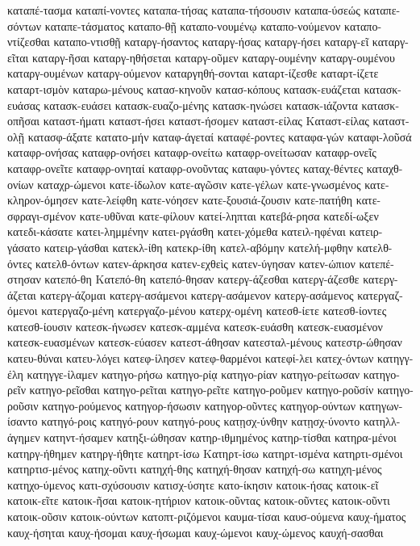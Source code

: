 {καταπέ-τασμα
καταπί-νοντες
καταπα-τήσας
καταπα-τήσουσιν
καταπα-ύσεώς
καταπε-σόντων
καταπε-τάσματος
καταπο-θῇ
καταπο-νουμένῳ
καταπο-νούμενον
καταπο-ντίζεσθαι
καταπο-ντισθῇ
καταργ-ήσαντος
καταργ-ήσας
καταργ-ήσει
καταργ-εῖ
καταργ-εῖται
καταργ-ῆσαι
καταργ-ηθήσεται
καταργ-οῦμεν
καταργ-ουμένην
καταργ-ουμένου
καταργ-ουμένων
καταργ-ούμενον
καταργηθή-σονται
καταρτ-ίζεσθε
καταρτ-ίζετε
καταρτ-ισμὸν
καταρω-μένους
κατασ-κηνοῦν
κατασ-κόπους
κατασκ-ευάζεται
κατασκ-ευάσας
κατασκ-ευάσει
κατασκ-ευαζο-μένης
κατασκ-ηνώσει
κατασκ-ιάζοντα
κατασκ-οπῆσαι
καταστ-ήματι
καταστ-ήσει
καταστ-ήσομεν
καταστ-είλας
Καταστ-είλας
καταστ-ολῇ
κατασφ-άξατε
κατατο-μήν
καταφ-άγεταί
καταφέ-ροντες
καταφα-γών
καταφι-λοῦσά
καταφρ-ονήσας
καταφρ-ονήσει
καταφρ-ονείτω
καταφρ-ονείτωσαν
καταφρ-ονεῖς
καταφρ-ονεῖτε
καταφρ-ονηταί
καταφρ-ονοῦντας
καταφυ-γόντες
καταχ-θέντες
καταχθ-ονίων
καταχρ-ώμενοι
κατε-ίδωλον
κατε-αγῶσιν
κατε-γέλων
κατε-γνωσμένος
κατε-κληρον-όμησεν
κατε-λείφθη
κατε-νόησεν
κατε-ξουσιά-ζουσιν
κατε-πατήθη
κατε-σφραγι-σμένον
κατε-υθῦναι
κατε-φίλουν
κατεί-ληπται
κατεβά-ρησα
κατεδί-ωξεν
κατεδι-κάσατε
κατει-λημμένην
κατει-ργάσθη
κατει-χόμεθα
κατειλ-ηφέναι
κατειρ-γάσατο
κατειρ-γάσθαι
κατεκλ-ίθη
κατεκρ-ίθη
κατελ-αβόμην
κατελή-μφθην
κατελθ-όντες
κατελθ-όντων
κατεν-άρκησα
κατεν-εχθεὶς
κατεν-ύγησαν
κατεν-ώπιον
κατεπέ-στησαν
κατεπό-θη
Κατεπό-θη
κατεπό-θησαν
κατεργ-άζεσθαι
κατεργ-άζεσθε
κατεργ-άζεται
κατεργ-άζομαι
κατεργ-ασάμενοι
κατεργ-ασάμενον
κατεργ-ασάμενος
κατεργαζ-όμενοι
κατεργαζο-μένη
κατεργαζο-μένου
κατερχ-ομένη
κατεσθ-ίετε
κατεσθ-ίοντες
κατεσθ-ίουσιν
κατεσκ-ήνωσεν
κατεσκ-αμμένα
κατεσκ-ευάσθη
κατεσκ-ευασμένον
κατεσκ-ευασμένων
κατεσκ-εύασεν
κατεστ-άθησαν
κατεσταλ-μένους
κατεστρ-ώθησαν
κατευ-θύναι
κατευ-λόγει
κατεφ-ίλησεν
κατεφ-θαρμένοι
κατεφί-λει
κατεχ-όντων
κατηγγ-έλη
κατηγγε-ίλαμεν
κατηγο-ρήσω
κατηγο-ρίᾳ
κατηγο-ρίαν
κατηγο-ρείτωσαν
κατηγο-ρεῖν
κατηγο-ρεῖσθαι
κατηγο-ρεῖται
κατηγο-ρεῖτε
κατηγο-ροῦμεν
κατηγο-ροῦσίν
κατηγο-ροῦσιν
κατηγο-ρούμενος
κατηγορ-ήσωσιν
κατηγορ-οῦντες
κατηγορ-ούντων
κατηγων-ίσαντο
κατηγό-ροις
κατηγό-ρουν
κατηγό-ρους
κατῃσχ-ύνθην
κατῃσχ-ύνοντο
κατηλλ-άγημεν
κατηντ-ήσαμεν
κατηξι-ώθησαν
κατηρ-ιθμημένος
κατηρ-τίσθαι
κατηρα-μένοι
κατηργ-ήθημεν
κατηργ-ήθητε
κατηρτ-ίσω
Κατηρτ-ίσω
κατηρτ-ισμένα
κατηρτι-σμένοι
κατηρτισ-μένος
κατηχ-οῦντι
κατηχή-θης
κατηχή-θησαν
κατηχή-σω
κατηχη-μένος
κατηχο-ύμενος
κατι-σχύσουσιν
κατισχ-ύσητε
κατο-ίκησιν
κατοικ-ήσας
κατοικ-εῖ
κατοικ-εῖτε
κατοικ-ῆσαι
κατοικ-ητήριον
κατοικ-οῦντας
κατοικ-οῦντες
κατοικ-οῦντι
κατοικ-οῦσιν
κατοικ-ούντων
κατοπτ-ριζόμενοι
καυμα-τίσαι
καυσ-ούμενα
καυχ-ήματος
καυχ-ήσηται
καυχ-ήσομαι
καυχ-ήσωμαι
καυχ-ώμενοι
καυχ-ώμενος
καυχή-σασθαι
}
